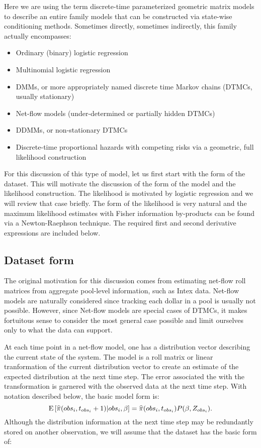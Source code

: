 \documentclass[10pt]{article}
\begin{document}
Here we are using the term discrete-time parameterized geometric matrix models to describe an entire family models that can
be constructed via state-wise conditioning methods. Sometimes directly, sometimes indirectly, this family actually encompasses:
\begin{itemize}
\item Ordinary (binary) logistic regression
\item Multinomial logistic regression
\item DMMs, or more appropriately named discrete time Markov chains (DTMCs, usually stationary)
\item Net-flow models (under-determined or partially hidden DTMCs)
\item DDMMs, or non-stationary DTMCs
\item Discrete-time proportional hazards with competing risks via a geometric, full likelihood construction
\end{itemize}

For this discussion of this type of model, let us first start with the form of the dataset.  This will motivate the discussion 
of the form of the model and the likelihood construction.  The likelihood is motivated by logistic regression and we will review that case 
briefly.  The form of the likelihood is very natural and the maximum likelihood estimates with Fisher information by-products
can be found via a Newton-Raephson technique.  The required first and second derivative expressions are included below.


\subsection{Dataset form}

The original motivation for this discussion comes from estimating net-flow roll matrices from aggregate pool-level information, such 
as Intex data.  Net-flow models are naturally considered since tracking each dollar in a pool is usually not possible.  However, 
since Net-flow models are special cases of DTMCs, it makes fortuitous sense to consider the most general case possible and limit ourselves
only to what the data can support.

At each time point in a net-flow model, one has a distribution vector describing the current state of the system.  
The model is a roll matrix or linear tranformation of the current distribution vector to create an estimate of the expected distribution 
at the next time step.  The error associated the with the transformation is garnered with the observed data at the next time step.
With notation described below, the basic model form is:
	$$\text{E}\left[{{\widehat{\pi}(obs_i,t_{obs_i}+1)}|{obs_i,\beta}}\right]= \widehat{\pi}(obs_i,t_{obs_i})P(\beta,Z_{obs_i}).$$
Although the distribution information at the next time step may be redundantly stored on another observation, we will assume that the 
dataset has the basic form of:
\end{document}
